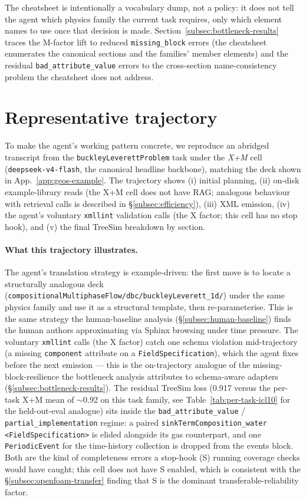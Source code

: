 \documentclass{article}
\newcommand{\promptinput}[2][]{%
  \VerbatimInput[
    fontsize=\footnotesize,
    breaklines=true,
    breakanywhere=true,
    breaksymbolright=\small$\hookrightarrow$,
    obeytabs=true,
    tabsize=2,
    frame=leftline,
    framerule=0.6pt,
    rulecolor=\color{gray},
    #1
  ]{#2}%
}
\begin{document}
The cheatsheet is intentionally a vocabulary dump, not a policy: it does not tell the agent which physics family the current task requires, only which element names to use once that decision is made. Section~\ref{subsec:bottleneck-results} traces the M-factor lift to reduced \texttt{missing\_block} errors (the cheatsheet enumerates the canonical sections and the families' member elements) and the residual \texttt{bad\_attribute\_value} errors to the cross-section name-consistency problem the cheatsheet does not address.


\section{Representative trajectory}
\label{app:case-study}

To make the agent's working pattern concrete, we reproduce an abridged transcript from the \texttt{buckleyLeverettProblem} task under the \emph{X+M} cell (\texttt{deepseek-v4-flash}, the canonical headline backbone), matching the deck shown in App.~\ref{app:geos-example}. The trajectory shows (i) initial planning, (ii) on-disk example-library reads (the X+M cell does not have RAG; analogous behaviour with retrieval calls is described in \S\ref{subsec:efficiency}), (iii) XML emission, (iv) the agent's voluntary \texttt{xmllint} validation calls (the X factor; this cell has no stop hook), and (v) the final TreeSim breakdown by section.

\promptinput{assets/trajectory_buckleyleverett_xm.txt}

\paragraph{What this trajectory illustrates.} The agent's translation strategy is example-driven: the first move is to locate a structurally analogous deck (\texttt{compositionalMultiphaseFlow/dbc/buckleyLeverett\_1d/}) under the same physics family and use it as a structural template, then re-parameterise. This is the same strategy the human-baseline analysis (\S\ref{subsec:human-baseline}) finds the human authors approximating via Sphinx browsing under time pressure. The voluntary \texttt{xmllint} calls (the X factor) catch one schema violation mid-trajectory (a missing \texttt{component} attribute on a \texttt{FieldSpecification}), which the agent fixes before the next emission --- this is the on-trajectory analogue of the missing-block-resilience the bottleneck analysis attributes to schema-aware adapters (\S\ref{subsec:bottleneck-results}). The residual TreeSim loss (0.917 versus the per-task X+M mean of $\sim$0.92 on this task family, see Table~\ref{tab:per-task-icl10} for the held-out-eval analogue) sits inside the \texttt{bad\_attribute\_value} / \texttt{partial\_implementation} regime: a paired \texttt{sinkTermComposition\_water} \texttt{<FieldSpecification>} is elided alongside its gas counterpart, and one \texttt{PeriodicEvent} for the time-history collection is dropped from the events block. Both are the kind of completeness errors a stop-hook (S) running coverage checks would have caught; this cell does not have S enabled, which is consistent with the \S\ref{subsec:openfoam-transfer} finding that S is the dominant transferable-reliability factor.



\newpage

\end{document}
